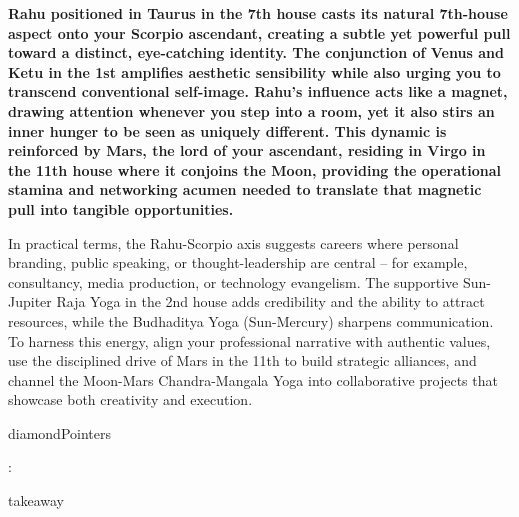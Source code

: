 
\label{topic10}

{\fontsize{9.5}{13.8}\selectfont\bfseries\color{DeepSlate} Rahu positioned in Taurus in the 7th house casts its natural 7th-house aspect onto your Scorpio ascendant, creating a subtle yet powerful pull toward a distinct, eye-catching identity. The conjunction of Venus and Ketu in the 1st amplifies aesthetic sensibility while also urging you to transcend conventional self-image. Rahu's influence acts like a magnet, drawing attention whenever you step into a room, yet it also stirs an inner hunger to be seen as uniquely different. This dynamic is reinforced by Mars, the lord of your ascendant, residing in Virgo in the 11th house where it conjoins the Moon, providing the operational stamina and networking acumen needed to translate that magnetic pull into tangible opportunities.}\par\vspace{2mm}

{\fontsize{9}{13}\selectfont In practical terms, the Rahu-Scorpio axis suggests careers where personal branding, public speaking, or thought-leadership are central -- for example, consultancy, media production, or technology evangelism. The supportive Sun-Jupiter Raja Yoga in the 2nd house adds credibility and the ability to attract resources, while the Budhaditya Yoga (Sun-Mercury) sharpens communication. To harness this energy, align your professional narrative with authentic values, use the disciplined drive of Mars in the 11th to build strategic alliances, and channel the Moon-Mars Chandra-Mangala Yoga into collaborative projects that showcase both creativity and execution.}\par\vspace{1.8mm}

{\fontsize{9}{13}\selectfont diamondPointers}\par\vspace{1.8mm}

{\fontsize{9}{13}\selectfont :}\par\vspace{1.8mm}

{\fontsize{9}{13}\selectfont takeaway}\par\vspace{1.8mm}

